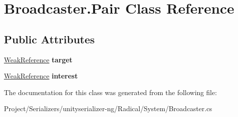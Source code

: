 \hypertarget{class_broadcaster_1_1_pair}{}\section{Broadcaster.\+Pair Class Reference}
\label{class_broadcaster_1_1_pair}
\subsection*{Public Attributes}
\begin{DoxyCompactItemize}
\item 
\mbox{\label{class_broadcaster_1_1_pair_ae3e5361ccca9a77940093ed3e9a62919}} 
\hyperlink{class_weak_reference}{Weak\+Reference} {\bfseries target}
\item 
\mbox{\label{class_broadcaster_1_1_pair_a30168423d2d6d05606be19d04ff0c697}} 
\hyperlink{class_weak_reference}{Weak\+Reference} {\bfseries interest}
\end{DoxyCompactItemize}


The documentation for this class was generated from the following file\+:\begin{DoxyCompactItemize}
\item 
Project/\+Serializers/unityserializer-\/ng/\+Radical/\+System/Broadcaster.\+cs\end{DoxyCompactItemize}
